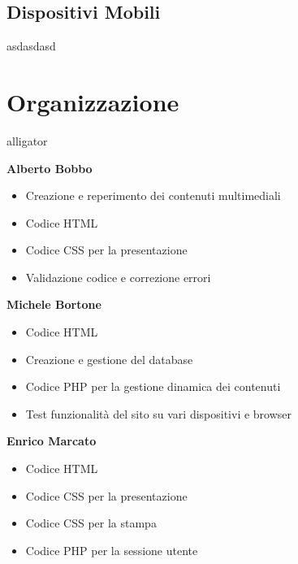 \documentclass[10pt, a4paper]{article}
\begin{document}
\subsection{Dispositivi Mobili}

asdasdasd
\section{Organizzazione}

\begin{labeling}{alligator}
	\item[\textbf{Alberto Bobbo}] \item[] %
		\begin{itemize}
			\item{Creazione e reperimento dei contenuti multimediali}
			\item{Codice HTML }
			\item{Codice CSS per la presentazione}
			\item{Validazione codice e correzione errori}
		\end{itemize}
	\item[\textbf{Michele Bortone}] \item[]
		\begin{itemize}
			\item{Codice HTML}
			\item{Creazione e gestione del database}
			\item{Codice PHP per la gestione dinamica dei contenuti}
			\item{Test funzionalità del sito su vari dispositivi e browser}
		\end{itemize}
	\item[\textbf{Enrico Marcato}] \item[]
		\begin{itemize}
			\item{Codice HTML }
			\item{Codice CSS per la presentazione}
			\item{Codice CSS per la stampa}
			\item{Codice PHP per la sessione utente   }
		\end{itemize}
\end{labeling}
\end{document}
